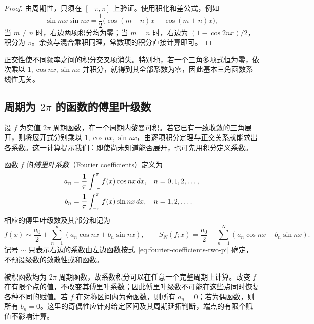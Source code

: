 \begin{proof}
由周期性，只须在 $[-\pi,\pi]$ 上验证。使用积化和差公式，例如
\[
    \sin mx\sin nx
      =\frac12\bigl(\cos(m-n)x-\cos(m+n)x\bigr),
\]
当 $m\neq n$ 时，右边两项积分均为零；当 $m=n$ 时，右边为 $(1-\cos2nx)/2$，积分为 $\pi$。余弦与混合乘积同理，常数项的积分直接计算即可。
\end{proof}

正交性使不同频率之间的积分交叉项消失。特别地，若一个三角多项式恒为零，依次乘以 $1,\cos nx,\sin nx$ 并积分，就得到其全部系数为零，因此基本三角函数系线性无关。

\subsection{周期为 \texorpdfstring{$2\pi$}{2pi} 的函数的傅里叶级数}
\label{subsec:fourier-series-of-two-pi-periodic-functions}

设 $f$ 为实值 $2\pi$ 周期函数，在一个周期内黎曼可积。若它已有一致收敛的三角展开，则将展开式分别乘以 $1,\cos nx,\sin nx$，由逐项积分定理与正交关系就能求出各系数。这一计算提示我们：即使尚未知道能否展开，也可先用积分定义系数。

\begin{definition}
\label{def:fourier-coefficients-and-series}
函数 $f$ 的\emph{傅里叶系数}（Fourier coefficients）定义为
\begin{align}
    a_n&=\frac1\pi\int_{-\pi}^{\pi}f(x)\cos nx\,dx,
          &&n=0,1,2,\ldots,\notag\\
    b_n&=\frac1\pi\int_{-\pi}^{\pi}f(x)\sin nx\,dx,
          &&n=1,2,\ldots.
    \label{eq:fourier-coefficients-two-pi}
\end{align}
相应的傅里叶级数及其部分和记为
\begin{equation}
    f(x)\sim\frac{a_0}{2}
          +\sum_{n=1}^\infty(a_n\cos nx+b_n\sin nx),
    \qquad
    S_N(f;x)=\frac{a_0}{2}
          +\sum_{n=1}^N(a_n\cos nx+b_n\sin nx).
    \label{eq:fourier-series-and-partial-sums}
\end{equation}
记号 $\sim$ 只表示右边的系数由左边函数按式~\eqref{eq:fourier-coefficients-two-pi} 确定，不预设级数的敛散性或和函数。
\end{definition}

被积函数均为 $2\pi$ 周期函数，故系数积分可以在任意一个完整周期上计算。改变 $f$ 在有限个点的值，不改变其傅里叶系数；因此傅里叶级数不可能在这些点同时恢复各种不同的赋值。若 $f$ 在对称区间内为奇函数，则所有 $a_n=0$；若为偶函数，则所有 $b_n=0$。这里的奇偶性应针对给定区间及其周期延拓判断，端点的有限个赋值不影响计算。

